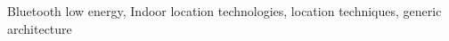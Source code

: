 \begin{keywords}
Bluetooth low energy, Indoor location technologies, location techniques, generic architecture
\end{keywords}
\clearpage
\thispagestyle{empty}
\cleardoublepage